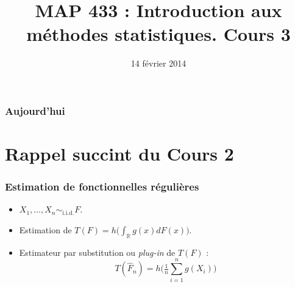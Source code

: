 ﻿\documentclass{beamer}
\title{MAP 433 : Introduction aux méthodes statistiques. Cours 3}
\DeclareMathOperator{\R}{{\mathbb R}}
\DeclareMathOperator{\PP}{{\mathbb P}}
\begin{document}
\date{14 février 2014}
\maketitle



\begin{frame}
\frametitle{Aujourd'hui}
\tableofcontents
\end{frame}
\section{Rappel succint du Cours 2}

\begin{frame}
\frametitle{Estimation de fonctionnelles régulières}
\begin{itemize}
\item $X_1,\ldots, X_n \sim_{\text{i.i.d.}} F$.
\item Estimation de $T(F) = h\big(\int_{\R}g(x)dF(x)\big)$.
\item Estimateur par {\color{red} substitution} ou {\it plug-in} de $T(F)$ :
$$\boxed{T(\widehat F_n) = h\Big(\tfrac{1}{n}\sum_{i = 1}^ng(X_i)\Big)}$$
\end{itemize}
\end{frame}
\end{document}
